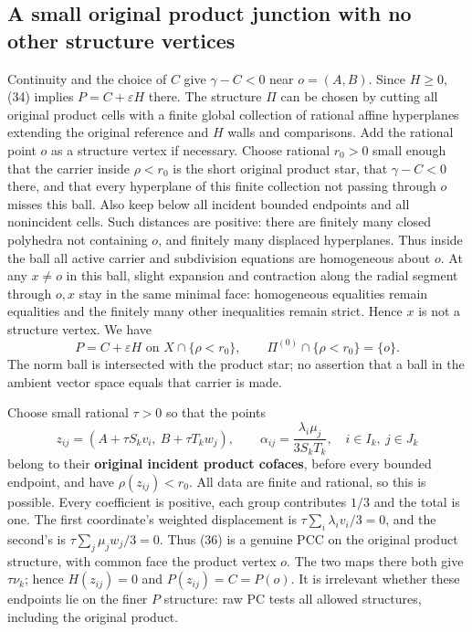 \documentclass[
  11pt,
]{article}
\begin{document}
\subsection{A small original product junction with no other structure
vertices}\label{a-small-original-product-junction-with-no-other-structure-vertices}

Continuity and the choice of \(C\) give \(\gamma-C<0\) near \(o=(A,B)\).
Since \(H\geq0\), (34) implies \(P=C+\varepsilon H\) there. The
structure \(\Pi\) can be chosen by cutting all original product cells
with a finite global collection of rational affine hyperplanes extending
the original reference and \(H\) walls and comparisons. Add the rational
point \(o\) as a structure vertex if necessary. Choose rational
\(r_0>0\) small enough that the carrier inside \(\rho<r_0\) is the short
original product star, that \(\gamma-C<0\) there, and that every
hyperplane of this finite collection not passing through \(o\) misses
this ball. Also keep below all incident bounded endpoints and all
nonincident cells. Such distances are positive: there are finitely many
closed polyhedra not containing \(o\), and finitely many displaced
hyperplanes. Thus inside the ball all active carrier and subdivision
equations are homogeneous about \(o\). At any \(x\ne o\) in this ball,
slight expansion and contraction along the radial segment through
\(o,x\) stay in the same minimal face: homogeneous equalities remain
equalities and the finitely many other inequalities remain strict. Hence
\(x\) is not a structure vertex. We have \[
 P=C+\varepsilon H\text{ on }X\cap\{\rho<r_0\},\qquad
 \Pi^{(0)}\cap\{\rho<r_0\}=\{o\}.                            \tag{35}
\] The norm ball is intersected with the product star; no assertion that
a ball in the ambient vector space equals that carrier is made.

Choose small rational \(\tau>0\) so that the points \[
 z_{ij}=(A+\tau S_kv_i,\ B+\tau T_kw_j),\qquad
 \alpha_{ij}=\frac{\lambda_i\mu_j}{3S_kT_k},
 \quad i\in I_k,\ j\in J_k                                  \tag{36}
\] belong to their \textbf{original incident product cofaces}, before
every bounded endpoint, and have \(\rho(z_{ij})<r_0\). All data are
finite and rational, so this is possible. Every coefficient is positive,
each group contributes \(1/3\) and the total is one. The first
coordinate's weighted displacement is \(\tau\sum_i\lambda_iv_i/3=0\),
and the second's is \(\tau\sum_j\mu_jw_j/3=0\). Thus (36) is a genuine
PCC on the original product structure, with common face the product
vertex \(o\). The two maps there both give \(\tau\nu_k\); hence
\(H(z_{ij})=0\) and \(P(z_{ij})=C=P(o)\). It is irrelevant whether these
endpoints lie on the finer \(P\) structure: raw PC tests all allowed
structures, including the original product.
\end{document}
